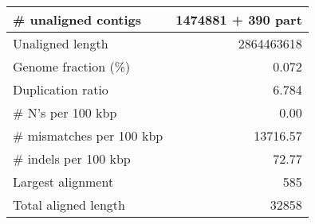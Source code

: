 \documentclass[12pt,a4paper]{article}
\begin{document}
\begin{table}[ht]
\begin{center}
\begin{tabular}{|l*{1}{|r}|}
\# unaligned contigs & 1474881 + 390 part \\ \hline
Unaligned length & 2864463618 \\ \hline
Genome fraction (\%) & 0.072 \\ \hline
Duplication ratio & 6.784 \\ \hline
\# N's per 100 kbp & 0.00 \\ \hline
\# mismatches per 100 kbp & 13716.57 \\ \hline
\# indels per 100 kbp & 72.77 \\ \hline
Largest alignment & 585 \\ \hline
Total aligned length & 32858 \\ \hline
\end{tabular}
\end{center}
\end{table}
\end{document}

